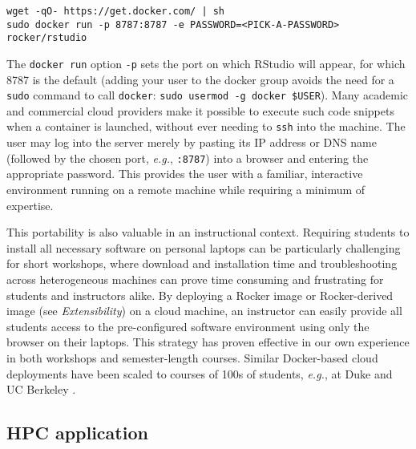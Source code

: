 \begin{verbatim}
wget -qO- https://get.docker.com/ | sh 
sudo docker run -p 8787:8787 -e PASSWORD=<PICK-A-PASSWORD> rocker/rstudio
\end{verbatim}

The \texttt{docker\ run} option \texttt{-p} sets the port on which
RStudio\textsuperscript{\textregistered} will appear, for which 8787 is
the default (adding your user to the docker group avoids the need for a
\texttt{sudo} command to call \texttt{docker}:
\texttt{sudo\ usermod\ -g\ docker\ \$USER}). Many academic and
commercial cloud providers make it possible to execute such code
snippets when a container is launched, without ever needing to
\texttt{ssh} into the machine. The user may log into the server merely
by pasting its IP address or DNS name (followed by the chosen port,
\emph{e.g.}, \texttt{:8787}) into a browser and entering the appropriate
password. This provides the user with a familiar, interactive
environment running on a remote machine while requiring a minimum of
expertise.

This portability is also valuable in an instructional context. Requiring
students to install all necessary software on personal laptops can be
particularly challenging for short workshops, where download and
installation time and troubleshooting across heterogeneous machines can
prove time consuming and frustrating for students and instructors alike.
By deploying a Rocker image or Rocker-derived image (see
\emph{Extensibility}) on a cloud machine, an instructor can easily
provide all students access to the pre-configured software environment
using only the browser on their laptops. This strategy has proven
effective in our own experience in both workshops and semester-length
courses. Similar Docker-based cloud deployments have been scaled to
courses of 100s of students, \emph{e.g.}, at Duke \citep{Mine} and UC
Berkeley \citep{data8}.

\subsection{HPC application}\label{hpc-application}

